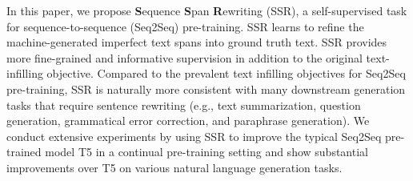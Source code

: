 In this paper, we propose \textbf{S}equence \textbf{S}pan \textbf{R}ewriting (SSR), a self-supervised task for sequence-to-sequence (Seq2Seq) pre-training. SSR learns to refine the machine-generated imperfect text spans into ground truth text. SSR provides more fine-grained and informative supervision in addition to the original text-infilling objective. Compared to the prevalent text infilling objectives for Seq2Seq pre-training, SSR is naturally more consistent with many downstream generation tasks that require sentence rewriting (e.g., text summarization, question generation, grammatical error correction, and paraphrase generation). We conduct extensive experiments by using SSR to improve the typical Seq2Seq pre-trained model T5 in a continual pre-training setting and show substantial improvements over T5 on various natural language generation tasks.
